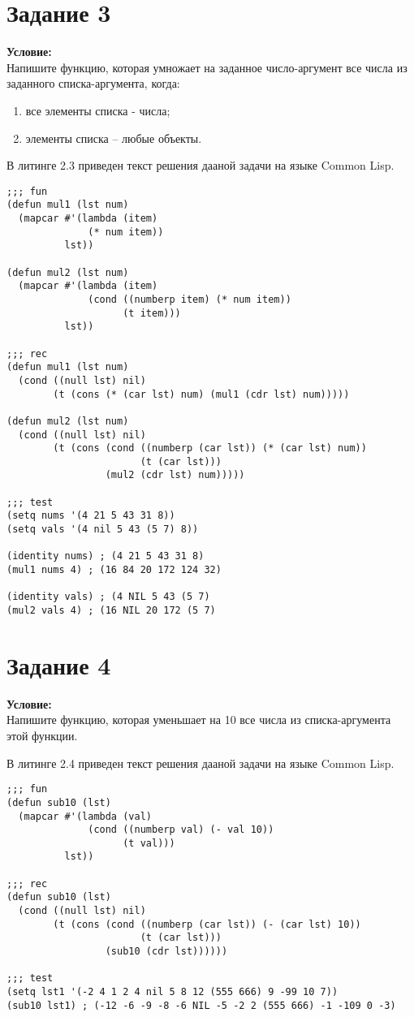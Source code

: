 \section{Задание \No{}3}
\textbf{Условие:}\\Напишите функцию, которая умножает на заданное число-аргумент все числа из заданного списка-аргумента, когда:
\begin{enumerate}
	\item все элементы списка - числа;
	\item элементы списка -- любые объекты.
\end{enumerate}

В литинге 2.3 приведен текст решения дааной задачи на языке Common Lisp.

\begin{lstlisting}[caption={Задание \No{}3}]
;;; fun
(defun mul1 (lst num)
  (mapcar #'(lambda (item)
              (* num item))
          lst))

(defun mul2 (lst num)
  (mapcar #'(lambda (item)
              (cond ((numberp item) (* num item))
                    (t item)))
          lst))

;;; rec
(defun mul1 (lst num)
  (cond ((null lst) nil)
        (t (cons (* (car lst) num) (mul1 (cdr lst) num)))))

(defun mul2 (lst num)
  (cond ((null lst) nil)
        (t (cons (cond ((numberp (car lst)) (* (car lst) num))
                       (t (car lst)))
                 (mul2 (cdr lst) num)))))

;;; test
(setq nums '(4 21 5 43 31 8))
(setq vals '(4 nil 5 43 (5 7) 8))

(identity nums) ; (4 21 5 43 31 8)
(mul1 nums 4) ; (16 84 20 172 124 32)

(identity vals) ; (4 NIL 5 43 (5 7)
(mul2 vals 4) ; (16 NIL 20 172 (5 7)
\end{lstlisting}

\section{Задание \No{}4}
\textbf{Условие:}\\Напишите функцию, которая уменьшает на 10 все числа из списка-аргумента этой функции.

В литинге 2.4 приведен текст решения дааной задачи на языке Common Lisp.

\begin{lstlisting}[caption={Задание \No{}4}]
;;; fun
(defun sub10 (lst)
  (mapcar #'(lambda (val)
              (cond ((numberp val) (- val 10))
                    (t val)))
          lst))

;;; rec
(defun sub10 (lst)
  (cond ((null lst) nil)
        (t (cons (cond ((numberp (car lst)) (- (car lst) 10))
                       (t (car lst)))
                 (sub10 (cdr lst))))))

;;; test
(setq lst1 '(-2 4 1 2 4 nil 5 8 12 (555 666) 9 -99 10 7))
(sub10 lst1) ; (-12 -6 -9 -8 -6 NIL -5 -2 2 (555 666) -1 -109 0 -3)
\end{lstlisting}

